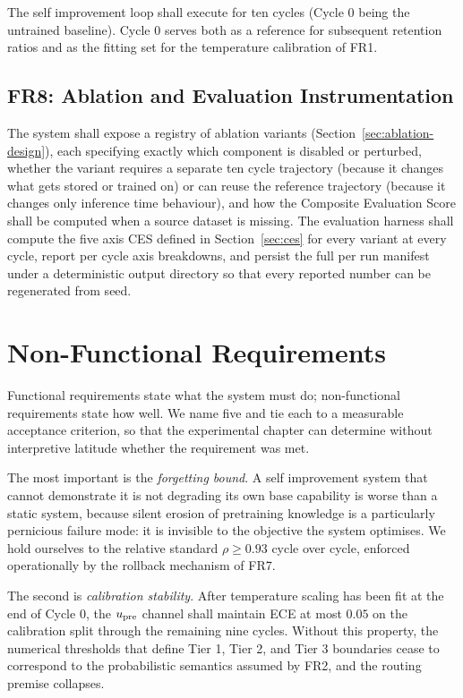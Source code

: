 The self improvement loop shall execute for ten cycles (Cycle 0 being the untrained baseline). Cycle 0 serves both as a reference for subsequent retention ratios and as the fitting set for the temperature calibration of FR1.

\subsection{FR8: Ablation and Evaluation Instrumentation}
\label{sec:fr8}

The system shall expose a registry of ablation variants (Section~\ref{sec:ablation-design}), each specifying exactly which component is disabled or perturbed, whether the variant requires a separate ten cycle trajectory (because it changes what gets stored or trained on) or can reuse the reference trajectory (because it changes only inference time behaviour), and how the Composite Evaluation Score shall be computed when a source dataset is missing. The evaluation harness shall compute the five axis CES defined in Section~\ref{sec:ces} for every variant at every cycle, report per cycle axis breakdowns, and persist the full per run manifest under a deterministic output directory so that every reported number can be regenerated from seed.

\section{Non-Functional Requirements}
\label{sec:nfr}

Functional requirements state what the system must do; non-functional requirements state how well. We name five and tie each to a measurable acceptance criterion, so that the experimental chapter can determine without interpretive latitude whether the requirement was met.

The most important is the \emph{forgetting bound}. A self improvement system that cannot demonstrate it is not degrading its own base capability is worse than a static system, because silent erosion of pretraining knowledge is a particularly pernicious failure mode: it is invisible to the objective the system optimises. We hold ourselves to the relative standard $\rho \geq 0.93$ cycle over cycle, enforced operationally by the rollback mechanism of FR7.

The second is \emph{calibration stability}. After temperature scaling has been fit at the end of Cycle 0, the $u_{\text{pre}}$ channel shall maintain ECE at most $0.05$ on the calibration split through the remaining nine cycles. Without this property, the numerical thresholds that define Tier 1, Tier 2, and Tier 3 boundaries cease to correspond to the probabilistic semantics assumed by FR2, and the routing premise collapses.

